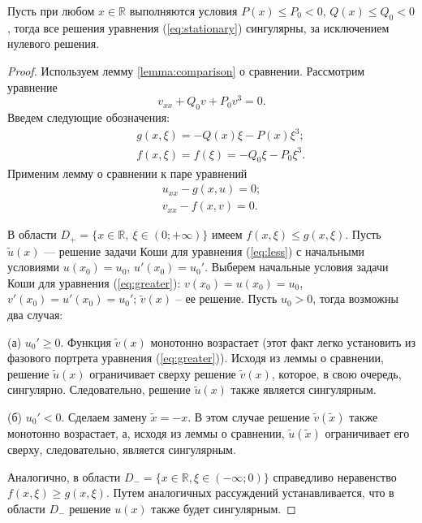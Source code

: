 \begin{proposition}
Пусть при любом $x \in \mathbb{R}$ выполняются условия $P(x) \le P_0 < 0$, $Q(x) \le Q_0 < 0$, тогда  все решения уравнения (\ref{eq:stationary}) сингулярны, за исключением нулевого решения.
\label{prop:singular}
\end{proposition}
%
\begin{proof}
Используем лемму \ref{lemma:comparison} о сравнении.
Рассмотрим уравнение
%
\begin{equation}
v_{xx} + Q_0 v + P_0 v^3 = 0.
\end{equation}
%
Введем следующие обозначения:
%
\begin{eqnarray}
&& g(x, \xi) = -Q(x)\xi - P(x)\xi^3;\\
&& f(x, \xi) = f(\xi) = -Q_0 \xi - P_0 \xi^3.
\end{eqnarray}
%
Применим лемму о сравнении к паре уравнений
%
\begin{eqnarray}
u_{xx} - g(x, u) = 0; \label{eq:less} \\
v_{xx} - f(x, v) = 0. \label{eq:greater}
\end{eqnarray}
%

В области $D_+ = \{ x \in \mathbb{R},~\xi \in (0; +\infty) \}$ имеем $f(x, \xi) \le g(x, \xi)$. Пусть $\tilde{u}(x)$ --- решение задачи Коши для уравнения (\ref{eq:less}) с начальными условиями $u(x_0) = u_0$, $u'(x_0) = u_0'$.
Выберем начальные условия задачи Коши для уравнения (\ref{eq:greater}): $v(x_0) = u(x_0) = u_0$, $v'(x_0) = u'(x_0) = u_0'$; $\tilde{v}(x)$ -- ее решение.
Пусть $u_0 > 0$, тогда возможны два случая:

(а) $u_0' \ge 0$.
Функция $\tilde{v}(x)$  монотонно возрастает (этот факт легко установить из фазового портрета уравнения (\ref{eq:greater})).
Исходя из леммы о сравнении, решение $\tilde{u}(x)$ ограничивает сверху решение $\tilde{v}(x)$, которое, в свою очередь, сингулярно.
Следовательно, решение $\tilde{u}(x)$ также является сингулярным.

(б) $u_0' < 0$.
Сделаем замену $\tilde{x} = -x$.
В этом случае решение $\tilde{v}(\tilde{x})$  также монотонно возрастает, а, исходя из леммы
о сравнении, $\tilde{u}(\tilde{x})$ ограничивает его сверху, следовательно, является сингулярным.

Аналогично, в области $D_- = \{x \in \mathbb{R}, \xi \in (-\infty; 0)\}$ справедливо неравенство $f(x,\xi) \ge g(x,\xi)$.
Путем аналогичных рассуждений устанавливается, что в области $D_-$ решение $u(x)$ также будет сингулярным.
\end{proof}

